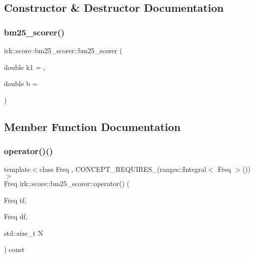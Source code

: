 \subsection{Constructor \& Destructor Documentation}
\mbox{\label{structirk_1_1score_1_1bm25__scorer_a8ba7a12182356ea58d5d1b5f279cf58a}} 
\subsubsection{\texorpdfstring{bm25\+\_\+scorer()}{bm25\_scorer()}}
{\footnotesize\ttfamily irk\+::score\+::bm25\+\_\+scorer\+::bm25\+\_\+scorer (\begin{DoxyParamCaption}\item[{double}]{k1 = {},  }\item[{double}]{b = {} }\end{DoxyParamCaption})\hspace{0.3cm}{\ttfamily [inline]}}



\subsection{Member Function Documentation}
\mbox{\label{structirk_1_1score_1_1bm25__scorer_aa82755eac7a52ec53f578cff81170422}} 
\subsubsection{\texorpdfstring{operator()()}{operator()()}}
{\footnotesize\ttfamily template$<$class Freq , C\+O\+N\+C\+E\+P\+T\+\_\+\+R\+E\+Q\+U\+I\+R\+E\+S\+\_\+(ranges\+::\+Integral$<$ Freq $>$()) $>$ \\
Freq irk\+::score\+::bm25\+\_\+scorer\+::operator() (\begin{DoxyParamCaption}\item[{Freq}]{tf,  }\item[{Freq}]{df,  }\item[{std\+::size\+\_\+t}]{N }\end{DoxyParamCaption}) const\hspace{0.3cm}{\ttfamily [inline]}}




